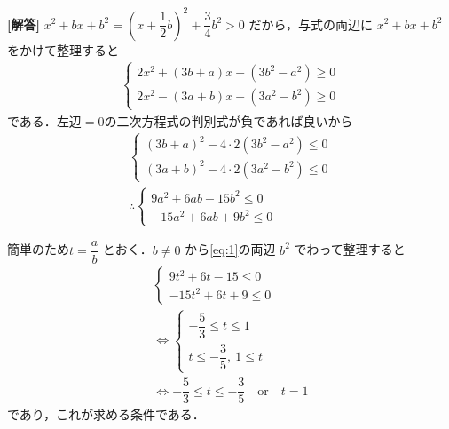 \documentclass[../../main.tex]{subfiles}
\begin{document}
\begin{oframed}
  
\end{oframed}

{\bf [解答]}
$x^2+bx+b^2 = \left(x + \dfrac{1}{2}b\right)^2 + \dfrac{3}{4}b^2 > 0$ だから，与式の両辺に $x^2+bx+b^2$ をかけて整理すると
\begin{align}
  \begin{cases}
    2x^2 + (3b+a)x + (3b^2-a^2) \ge 0 \\
    2x^2 - (3a+b)x + (3a^2-b^2) \ge 0
  \end{cases}
\end{align}
である．$\text{左辺}=0$の二次方程式の判別式が負であれば良いから
\begin{align}
  \begin{cases}
    (3b+a)^2 - 4 \cdot 2 (3b^2-a^2) \le 0 \\
    (3a+b)^2 - 4 \cdot 2 (3a^2-b^2) \le 0
  \end{cases} \\
  \therefore
  \begin{cases}
    9a^2 + 6ab - 15b^2 \le 0 \\
    -15a^2 + 6ab + 9b^2 \le 0
  \end{cases} \label{eq:1}
\end{align}

簡単のため$t = \dfrac{a}{b}$ とおく．$b \neq 0$ から\cref{eq:1}の両辺 $b^2$ でわって整理すると
\begin{align}
  \begin{cases}
    9t^2 + 6t - 15 \le 0 \\
    -15t^2 + 6t + 9 \le 0
  \end{cases} \\
  \iff
  \begin{cases}
    -\dfrac{5}{3} \le t \le 1 \\
    t \le -\dfrac{3}{5}, \ 1 \le t
  \end{cases} \\
  \iff -\dfrac{5}{3} \le t \le -\dfrac{3}{5} \quad \text{or} \quad t = 1
\end{align}
であり，これが求める条件である．
\end{document}

